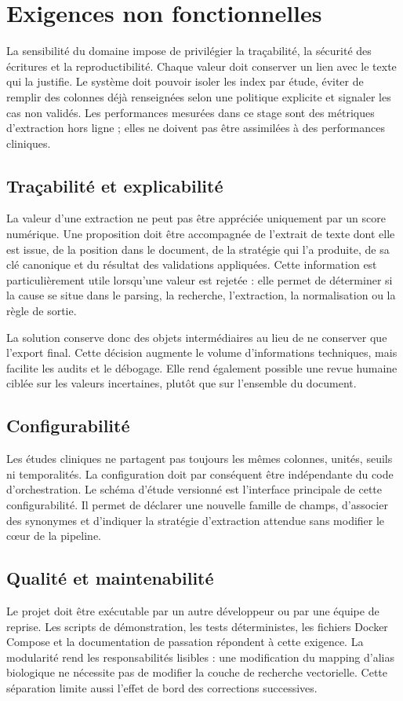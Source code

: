 \section{Exigences non fonctionnelles}
La sensibilité du domaine impose de privilégier la traçabilité, la sécurité des écritures et la reproductibilité. Chaque valeur doit conserver un lien avec le texte qui la justifie. Le système doit pouvoir isoler les index par étude, éviter de remplir des colonnes déjà renseignées selon une politique explicite et signaler les cas non validés. Les performances mesurées dans ce stage sont des métriques d'extraction hors ligne ; elles ne doivent pas être assimilées à des performances cliniques.

\subsection{Traçabilité et explicabilité}
La valeur d'une extraction ne peut pas être appréciée uniquement par un score numérique. Une proposition doit être accompagnée de l'extrait de texte dont elle est issue, de la position dans le document, de la stratégie qui l'a produite, de sa clé canonique et du résultat des validations appliquées. Cette information est particulièrement utile lorsqu'une valeur est rejetée : elle permet de déterminer si la cause se situe dans le parsing, la recherche, l'extraction, la normalisation ou la règle de sortie.

La solution conserve donc des objets intermédiaires au lieu de ne conserver que l'export final. Cette décision augmente le volume d'informations techniques, mais facilite les audits et le débogage. Elle rend également possible une revue humaine ciblée sur les valeurs incertaines, plutôt que sur l'ensemble du document.

\subsection{Configurabilité}
Les études cliniques ne partagent pas toujours les mêmes colonnes, unités, seuils ni temporalités. La configuration doit par conséquent être indépendante du code d'orchestration. Le schéma d'étude versionné est l'interface principale de cette configurabilité. Il permet de déclarer une nouvelle famille de champs, d'associer des synonymes et d'indiquer la stratégie d'extraction attendue sans modifier le cœur de la pipeline.

\subsection{Qualité et maintenabilité}
Le projet doit être exécutable par un autre développeur ou par une équipe de reprise. Les scripts de démonstration, les tests déterministes, les fichiers Docker Compose et la documentation de passation répondent à cette exigence. La modularité rend les responsabilités lisibles : une modification du mapping d'alias biologique ne nécessite pas de modifier la couche de recherche vectorielle. Cette séparation limite aussi l'effet de bord des corrections successives.

